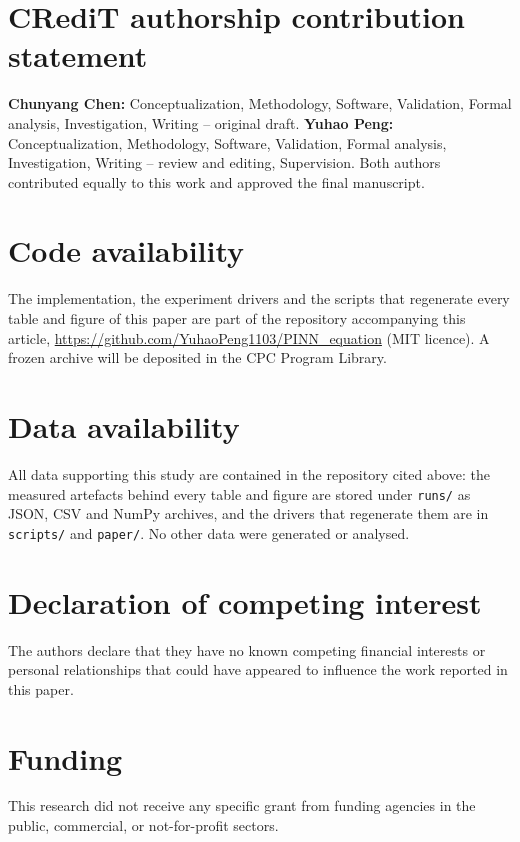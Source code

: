 \documentclass[preprint,12pt,number]{elsarticle}
\begin{document}










\section*{CRediT authorship contribution statement}
\textbf{Chunyang Chen:} Conceptualization, Methodology, Software, Validation,
Formal analysis, Investigation, Writing -- original draft. \textbf{Yuhao
Peng:} Conceptualization, Methodology, Software, Validation, Formal analysis,
Investigation, Writing -- review and editing, Supervision. Both authors
contributed equally to this work and approved the final manuscript.

\section*{Code availability}
The implementation, the experiment drivers and the scripts that regenerate
every table and figure of this paper are part of the repository accompanying
this article, \url{https://github.com/YuhaoPeng1103/PINN_equation} (MIT
licence). A frozen archive will be deposited in the CPC Program Library.

\section*{Data availability}
All data supporting this study are contained in the repository cited above:
the measured artefacts behind every table and figure are stored under
\texttt{runs/} as JSON, CSV and NumPy archives, and the drivers that
regenerate them are in \texttt{scripts/} and \texttt{paper/}. No other data
were generated or analysed.

\section*{Declaration of competing interest}
The authors declare that they have no known competing financial interests or
personal relationships that could have appeared to influence the work
reported in this paper.

\section*{Funding}
This research did not receive any specific grant from funding agencies in the
public, commercial, or not-for-profit sectors.
\end{document}
